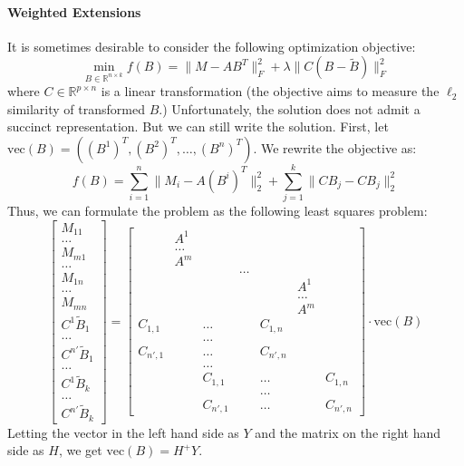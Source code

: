 \documentclass{article}
\def\R{\mathbb{R}}
\def\vec{\text{vec}}
\begin{document}
\paragraph{Weighted Extensions} It is sometimes desirable to consider the following
optimization objective:
\[ \min_{B \in \R^{n \times k}} f(B) = \| M - A B^T \|_F^2 + \lambda \| C (B - \tilde{B}) \|_F^2 \]
where $C \in \R^{p \times n}$ is a linear transformation (the objective aims to measure the
$\ell_2$ similarity of transformed $B$.)
Unfortunately, the solution does not admit a succinct representation. But we can still
write the solution. First, let $\vec(B) = ((B^1)^T, (B^2)^T, \ldots, (B^n)^T)$.
We rewrite the objective as:
\[ f(B) = \sum_{i=1}^n \| M_i - A (B^i)^T \|_2^2 + \sum_{j=1}^k \| C B_j - C B_j \|_2^2 \]
Thus, we can formulate the problem as the following least squares problem:
\[
   \begin{bmatrix} M_{11} \\ \ldots \\ M_{m1} \\ \ldots \\ M_{1n} \\ \ldots \\ M_{mn} \\ C^1 \tilde B_1 \\ \ldots \\ C^{n'} \tilde B_1 \\ \ldots \\ C^1 \tilde B_k \\ \ldots \\ C^{n'} \tilde B_k \end{bmatrix}
   =
   \begin{bmatrix}
     & A^1 & \\ & \ldots & \\ & A^m & \\  & & & \ldots & & & \\ & & & & & A^1 \\ & & & & & \ldots \\ & & & & & A^m \\
     C_{1,1} & & \ldots & & C_{1,n} \\& & \ldots \\ C_{n',1} & & \ldots & & C_{n',n} \\ & & \ldots \\
      & & C_{1,1}  &  & \ldots & & C_{1,n} \\& & & & \ldots \\  & & C_{n',1}  &  & \ldots & & C_{n',n}
   \end{bmatrix} \cdot \vec(B)
\]
Letting the vector in the left hand side as $Y$ and the matrix on the right hand side as $H$, we get $\vec(B) = H^+ Y$.
\end{document}
